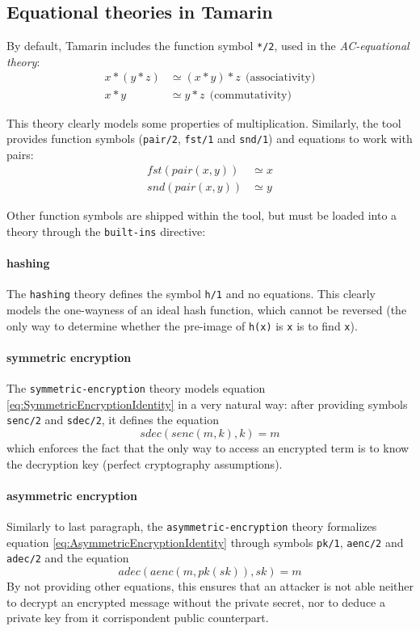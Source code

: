 \documentclass[fleqn,10pt]{SelfArx} %
\begin{document}
\subsection{Equational theories in Tamarin}

By default, Tamarin includes the function symbol \lstinline|*/2|, used in the \textit{AC-equational theory}:
\begin{align*}
    x * (y * z) &\simeq (x * y) * z\ \ \textrm{(associativity)}\\
    x * y &\simeq y * z\ \ \textrm{(commutativity)}
\end{align*}

This theory clearly models some properties of multiplication. Similarly, the tool provides function symbols (\lstinline|pair/2|, \lstinline|fst/1| and \lstinline|snd/1|) and equations to work with pairs: 
\begin{align*}
    fst(pair(x,y)) &\simeq x\\
    snd(pair(x,y)) &\simeq y
\end{align*}

Other function symbols are shipped within the tool, but must be loaded into a theory through the \lstinline|built-ins| directive:

\paragraph{hashing}
The \lstinline|hashing| theory defines the symbol \lstinline|h/1| and no equations. This clearly models the one-wayness of an ideal hash function, which cannot be reversed (the only way to determine whether the pre-image of \lstinline|h(x)| is \lstinline|x| is to find \lstinline|x|).

\paragraph{symmetric encryption}
The \lstinline|symmetric-encryption| theory models equation \ref{eq:SymmetricEncryptionIdentity} in a very natural way: after providing symbols \lstinline|senc/2| and \lstinline|sdec/2|, it defines the equation
\begin{equation*}
    sdec(senc(m,k),k) = m
\end{equation*}
which enforces the fact that the only way to access an encrypted term is to know the decryption key (perfect cryptography assumptions).

\paragraph{asymmetric encryption}
Similarly to last paragraph, the \lstinline|asymmetric-encryption| theory formalizes equation \ref{eq:AsymmetricEncryptionIdentity} through symbols \lstinline|pk/1|, \lstinline|aenc/2| and \lstinline|adec/2| and the equation
\begin{equation*}
    adec(aenc(m, pk(sk)), sk) = m
\end{equation*}
By not providing other equations, this ensures that an attacker is not able neither to decrypt an encrypted message without the private secret, nor to deduce a private key from it corrispondent public counterpart.
\end{document}
